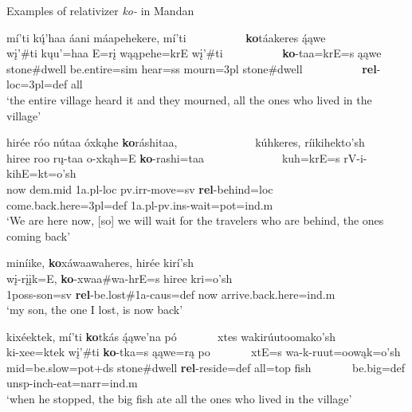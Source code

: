 \begin{exe}
\item\label{ExMandanKOreflex} Examples of relativizer \textit{ko-} in Mandan

	\begin{xlist}
	
	\item \glll mí'ti kų́'haa áani máapehekere, mí'ti ~ ~ ~  ~ ~ ~ \textbf{ko}táakeres ą́ąwe\\
	wį'\#ti kųu'=haa E=rį wąąpehe=krE wį'\#ti ~ ~ ~ ~ ~ ~ \textbf{ko}-taa=krE=s ąąwe\\
	\textnormal{stone}\#\textnormal{dwell} \textnormal{be.entire}=sim \textnormal{hear}=ss \textnormal{mourn}=3pl \textnormal{stone}\#\textnormal{dwell} ~ ~ ~ ~ ~ ~  \textbf{rel}-loc=3pl=def \textnormal{all}\\
	\glt `the entire village heard it and they mourned, all the ones who lived in the village' \citep[166]{hollow1973b}
	
	\item \glll hirée róo nútaa óxkąhe \textbf{ko}ráshitaa, ~ ~ ~ ~ ~ ~ ~ ~ kúhkeres, ríikihekto'sh\\
	hiree roo rų-taa o-xkąh=E \textbf{ko}-rashi=taa ~ ~ ~ ~ ~ ~ ~ ~ kuh=krE=s rV-i-kihE=kt=o'sh\\
	\textnormal{now} dem.mid 1a.pl-loc pv.irr-\textnormal{move}=sv \textbf{rel}-\textnormal{behind}=loc ~ ~ ~ ~ ~ ~ ~ ~  \textnormal{come.back.here}=3pl=def 1a.pl-pv.ins-\textnormal{wait}=pot=ind.m\\
	\glt 	`We are here now, [so] we will wait for the travelers who are behind, the ones coming back' \citep[194]{hollow1973b} 

	\item \glll miníike, \textbf{ko}xáwaawaheres, hirée kirí'sh\\
	wį-rįįk=E, \textbf{ko}-xwaa\#wa-hrE=s hiree kri=o'sh\\
	1poss-\textnormal{son}=sv \textbf{rel}-\textnormal{be.lost}\#1a-caus=def \textnormal{now} \textnormal{arrive.back.here}=ind.m\\
	\glt `my son, the one I lost, is now back' \citep[229]{hollow1973b}
	
	\item \glll kixéektek, mí'ti \textbf{ko}tkás ą́ąwe'na pó ~ ~ ~ ~ xtes wakirúutoomako'sh\\
	ki-xee=ktek wį'\#ti \textbf{ko}-tka=s ąąwe=rą po ~ ~ ~ ~ xtE=s wa-k-ruut=oowąk=o'sh\\
	mid=\textnormal{be.slow}=pot+ds \textnormal{stone}\#\textnormal{dwell} \textbf{rel}-\textnormal{reside}=def \textnormal{all}=top \textnormal{fish} ~ ~ ~ ~  \textnormal{be.big}=def unsp-inch-\textnormal{eat}=narr=ind.m\\
	\glt `when he stopped, the big fish ate all the ones who lived in the village' \citep[201]{hollow1973b}
	

\end{xlist}
\end{exe}
